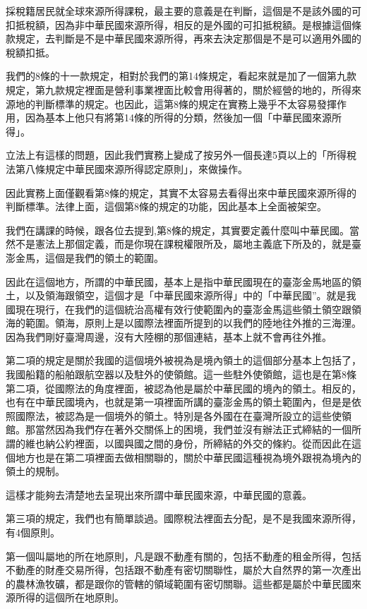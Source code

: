 \documentclass[oneside,sub3section]{ctexbook}
\begin{document}
採稅籍居民就全球來源所得課稅，最主要的意義是在判斷，這個是不是該外國的可扣抵稅額，因為非中華民國來源所得，相反的是外國的可扣抵稅額。是根據這個條款規定，去判斷是不是中華民國來源所得，再來去決定那個是不是可以適用外國的稅額扣抵。

我們的8條的十一款規定，相對於我們的第14條規定，看起來就是加了一個第九款規定，第九款規定裡面是營利事業裡面比較會用得著的，關於經營的地的，所得來源地的判斷標準的規定。也因此，這第8條的規定在實務上幾乎不太容易發揮作用，因為基本上他只有將第14條的所得的分類，然後加一個「中華民國來源所得」。

立法上有這樣的問題，因此我們實務上變成了按另外一個長達5頁以上的「所得稅法第八條規定中華民國來源所得認定原則」，來做操作。

因此實務上面僅觀看第8條的規定，其實不太容易去看得出來中華民國來源所得的判斷標準。法律上面，這個第8條的規定的功能，因此基本上全面被架空。

我們在講課的時候，跟各位去提到,第8條的規定，其實要定義什麼叫中華民國。當然不是憲法上那個定義，而是你現在課稅權限所及，屬地主義底下所及的，就是臺澎金馬，這個是我們的領土的範圍。

因此在這個地方，所謂的中華民國，基本上是指中華民國現在的臺澎金馬地區的領土，以及領海跟領空，這個才是「中華民國來源所得」中的「中華民國''。就是我國現在現行，在我們的這個統治高權有效行使範圍內的臺澎金馬這些領土領空跟領海的範圍。領海，原則上是以國際法裡面所提到的以我們的陸地往外推的三海浬。因為我們剛好臺灣周邊，沒有大陸棚的那個連結，基本上就不會再往外推。

第二項的規定是關於我國的這個境外被視為是境內領土的這個部分基本上包括了，我國船籍的船舶跟航空器以及駐外的使領館。這一些駐外使領館，這也是在第8條第二項，從國際法的角度裡面，被認為他是屬於中華民國的境內的領土。相反的，也有在中華民國境內，也就是第一項裡面所講的臺澎金馬的領土範圍內，但是是依照國際法，被認為是一個境外的領土。特別是各外國在在臺灣所設立的這些使領館。那當然因為我們存在著外交關係上的困境，我們並沒有辦法正式締結的一個所謂的維也納公約裡面，以國與國之間的身份，所締結的外交的條約。從而因此在這個地方也是在第二項裡面去做相關聯的，關於中華民國這種視為境外跟視為境內的領土的規制。

這樣才能夠去清楚地去呈現出來所謂中華民國來源，中華民國的意義。

第三項的規定，我們也有簡單談過。國際稅法裡面去分配，是不是我國來源所得，有4個原則。

第一個叫屬地的所在地原則，凡是跟不動產有關的，包括不動產的租金所得，包括不動產的財產交易所得，包括跟不動產有密切關聯性，屬於大自然界的第一次產出的農林漁牧礦，都是跟你的管轄的領域範圍有密切關聯。這些都是屬於中華民國來源所得的這個所在地原則。
\end{document}
